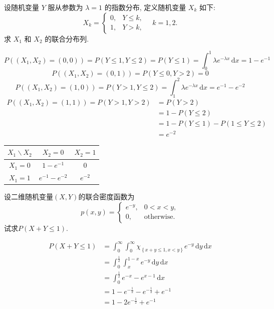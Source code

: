 \documentclass[../main.tex]{subfiles}
\begin{document}
\begin{exercise}{}{}
设随机变量 $Y$ 服从参数为 $\lambda = 1$ 的指数分布, 定义随机变量 $X_k$ 如下:
\[
X_k = \begin{cases}
0, & Y \leqslant k, \\
1, & Y > k,
\end{cases}
\quad k = 1, 2.
\]
求 $X_1$ 和 $X_2$ 的联合分布列.
\end{exercise} 
\begin{solution}
  \[
  P\left( \left( X_1,X_2 \right)= \left( 0,0 \right)   \right)= P\left( Y\le 1, Y\le 2 \right)= P\left( Y\le 1 \right)= \int_{0}^{1} \lambda e^{- \lambda x }\,\mathrm{d} x= 1-e^{- 1 }
  \] \[
  P\left( \left( X_1,X_2 \right)= \left( 0,1 \right)   \right)= P\left( Y\le 0, Y> 2 \right)= 0  
  \] \[
  P\left( \left( X_1,X_2 \right)= \left( 1,0 \right)   \right)= P\left( Y> 1, Y\le 2 \right)=\int_{1}^{2} \lambda e^{- \lambda x}\,\mathrm{d} x= e^{- 1 }-e^{-2  }
  \] \[
 \begin{aligned}
  P\left( \left( X_1,X_2 \right)= \left( 1,1 \right)   \right)= P\left( Y> 1, Y> 2 \right)&= P\left( Y> 2 \right) \\ 
   &=  1-P\left( Y\le 2 \right)\\ 
    &= 1-P\left( Y\le 1 \right)-P\left( 1\le Y\le 2 \right)\\ 
     &=e^{-2}
 \end{aligned}   
  \]\begin{tabular}{c|cc}
\hline
$X_1 \backslash X_2$ & $X_2=0$ & $X_2=1$ \\
\hline
$X_1=0$ & $1 - e^{-1}$ & $0$ \\
$X_1=1$ & $e^{-1} - e^{-2}$ & $e^{-2}$ \\
\hline
\end{tabular}
\end{solution}

\begin{exercise}{}{}
设二维随机变量$(X,Y)$的联合密度函数为
\[
p(x,y) = \begin{cases}
e^{-y}, & 0 < x < y, \\
0, & \text{otherwise}.
\end{cases}
\]
试求$P(X+Y\leqslant 1)$.
\end{exercise}
\begin{solution}
   \[
  \begin{aligned}
   P\left( X+ Y\le 1 \right)&=  \int_{0}^{\infty} \int_{0}^{\infty}\chi _{\left\{ x+ y\le  1 , x< y\right\}}e^{-y}\,\mathrm{d} y\,\mathrm{d} x  \\ 
    &=  \int_{0}^{\frac{1 }{2 } } \int_{x}^{1-x}e^{-y}\,\mathrm{d} y\,\mathrm{d} x\\ 
     &=  \int_{0}^{\frac{1 }{2 }  }e^{-x}-e^{x-1}\,\mathrm{d} x\\ 
      &=  1-e^{-\frac{1 }{2 } }- e^{-\frac{1 }{2 } }+ e^{-1}\\ 
       &= 1-2e^{-\frac{1 }{2 } }+ e^{-1}
  \end{aligned}
   \]
\end{solution}
\end{document}
